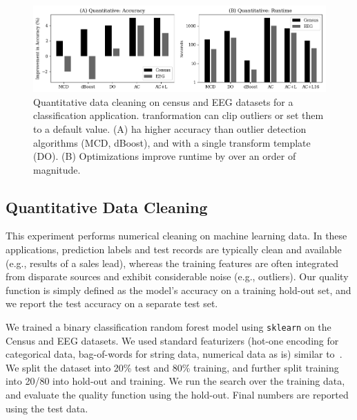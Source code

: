 
\begin{figure}
    \centering
    \includegraphics[width=\columnwidth]{ac-experiments/exp2.png}
    \caption{\small Quantitative data cleaning on census and EEG datasets for a classification application.  \sys tranformation can clip outliers or set them to a default value. (A) \sys ha higher accuracy than outlier detection algorithms (MCD, dBoost), and \sys with a single transform template (DO).  (B) Optimizations improve \sys runtime by over an order of magnitude.  \label{exp2a}}
\end{figure}

\subsection*{Quantitative Data Cleaning}\label{s:expquant}
This experiment performs numerical cleaning on machine learning data.  In these applications, prediction labels and test records are typically clean and available (e.g., results of a sales lead), whereas the training features are often integrated from disparate sources and exhibit considerable noise (e.g., outliers).  Our quality function is simply defined as the model's accuracy on a training hold-out set, and we report the test accuracy on a separate test set.

We trained a binary classification random forest model using \texttt{sklearn} on the Census and EEG datasets.  We used standard featurizers (hot-one encoding for categorical data, bag-of-words for string data, numerical data as is) similar to~\cite{gokhale2014corleone}. 
We split the dataset into 20\% test and 80\% training, and further split training into 20/80 into hold-out and training.  We run the search over the training data, and evaluate the quality function using the hold-out.  Final numbers are reported using the test data.


